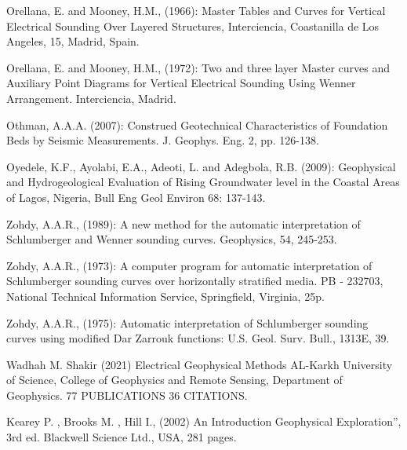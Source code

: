 \documentclass[12pt,a4paper]{report}
\begin{document}
Orellana, E. and Mooney, H.M., (1966): Master Tables and Curves for Vertical Electrical Sounding Over Layered Structures, Interciencia, Coastanilla de Los Angeles, 15, Madrid, Spain. 

Orellana, E. and Mooney, H.M., (1972): Two and three layer Master curves and Auxiliary Point Diagrams for Vertical Electrical Sounding Using Wenner Arrangement. Interciencia, Madrid. 

Othman, A.A.A. (2007): Construed Geotechnical Characteristics of Foundation Beds by Seismic Measurements. J. Geophys. Eng. 2, pp. 126-138. 

Oyedele, K.F., Ayolabi, E.A., Adeoti, L. and Adegbola, R.B. (2009): Geophysical and Hydrogeological Evaluation of Rising Groundwater level in the Coastal Areas of Lagos, Nigeria, Bull Eng Geol Environ 68: 137-143.

Zohdy, A.A.R., (1989): A new method for the automatic interpretation of Schlumberger and Wenner sounding curves. Geophysics, 54, 245-253. 

Zohdy, A.A.R., (1973): A computer program for automatic interpretation of Schlumberger sounding curves over horizontally stratified media. PB - 232703, National Technical Information Service, Springfield, Virginia, 25p.

Zohdy, A.A.R., (1975): Automatic interpretation of Schlumberger sounding curves using modified Dar Zarrouk functions: U.S. Geol. Surv. Bull., 1313E, 39.

Wadhah M. Shakir (2021) Electrical Geophysical Methods AL-Karkh University of Science, College of Geophysics and Remote Sensing, Department of Geophysics. 77 PUBLICATIONS 36 CITATIONS.

Kearey P. , Brooks M. , Hill I., (2002) An Introduction Geophysical Exploration”, 3rd ed. Blackwell Science Ltd., USA, 281 pages.
\end{document}
